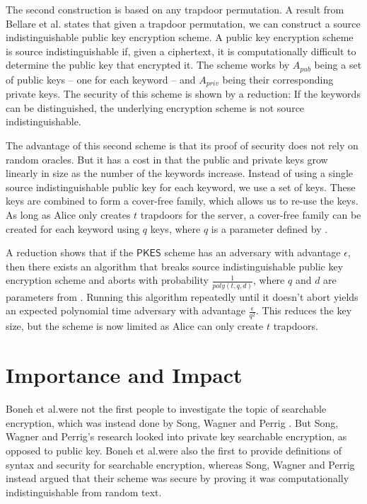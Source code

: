 \documentclass[a4paper,11pt]{article}
\begin{document}
    The second construction is based on any trapdoor permutation. A result from Bellare et al. \cite{bellare:source} states that given a trapdoor permutation, we can construct a source indistinguishable public key encryption scheme. A public key encryption scheme is source indistinguishable if, given a ciphertext, it is computationally difficult to determine the public key that encrypted it. The scheme works by $A_{pub}$ being a set of public keys -- one for each keyword -- and $A_{priv}$ being their corresponding private keys. The security of this scheme is shown by a reduction: If the keywords can be distinguished, the underlying encryption scheme is not source indistinguishable.

    The advantage of this second scheme is that its proof of security does not rely on random oracles. But it has a cost in that the public and private keys grow linearly in size as the number of the keywords increase. Instead of using a single source indistinguishable public key for each keyword, we use a set of keys. These keys are combined to form a cover-free family, which allows us to re-use the keys. As long as Alice only creates $t$ trapdoors for the server, a cover-free family can be created for each keyword using $q$ keys, where $q$ is a parameter defined by \cite{du:cover-free-families}.

    A reduction shows that if the $\mathsf{PKES}$ scheme has an adversary with advantage $\epsilon$, then there exists an algorithm that breaks source indistinguishable public key encryption scheme and aborts with probability $\frac{1}{poly(t, q, d)}$, where $q$ and $d$ are parameters from \cite{du:cover-free-families}. Running this algorithm repeatedly until it doesn't abort yields an expected polynomial time adversary with advantage $\frac{\epsilon}{q^2}$. This reduces the key size, but the scheme is now limited as Alice can only create $t$ trapdoors.

    \section{Importance and Impact}
    Boneh et al.\@ were not the first people to investigate the topic of searchable encryption, which was instead done by Song, Wagner and Perrig \cite{848445}. But Song, Wagner and Perrig's research looked into private key searchable encryption, as opposed to public key. Boneh et al.\@ were also the first to provide definitions of syntax and security for searchable encryption, whereas Song, Wagner and Perrig instead argued that their scheme was secure by proving it was computationally indistinguishable from random text.
\end{document}
